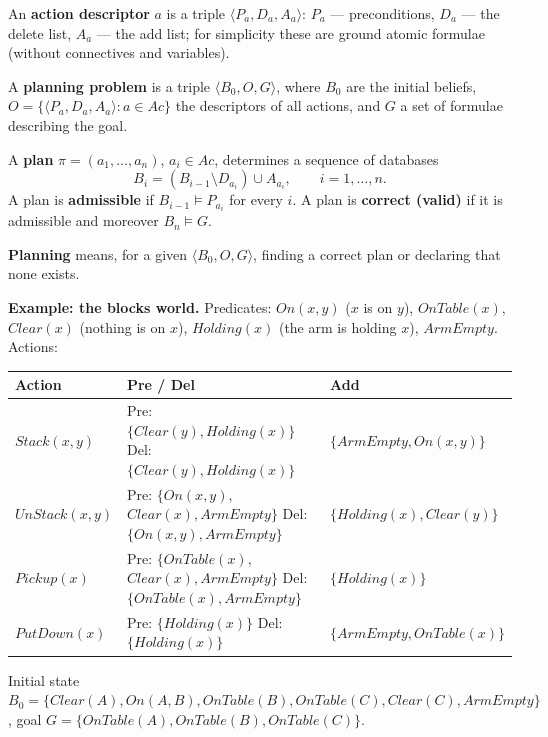 \documentclass[11pt,a4paper]{article}
\theoremstyle{definition}
\begin{document}
\begin{defbox}
An \textbf{action descriptor} $a$ is a triple $\langle P_a, D_a, A_a\rangle$:
$P_a$ --- preconditions, $D_a$ --- the delete list, $A_a$ --- the add list; for simplicity these
are ground atomic formulae (without connectives and variables).

A \textbf{planning problem} is a triple $\langle B_0, O, G\rangle$, where $B_0$ are the initial
beliefs, $O = \{\langle P_a,D_a,A_a\rangle : a \in \mathit{Ac}\}$ the descriptors of all actions,
and $G$ a set of formulae describing the goal.

A \textbf{plan} $\pi = (a_1,\dots,a_n)$, $a_i \in \mathit{Ac}$, determines a sequence of databases
\[
B_i = (B_{i-1} \setminus D_{a_i}) \cup A_{a_i}, \qquad i = 1,\dots,n .
\]
A plan is \textbf{admissible} if $B_{i-1} \models P_{a_i}$ for every $i$.
A plan is \textbf{correct (valid)} if it is admissible and moreover $B_n \models G$.

\textbf{Planning} means, for a given $\langle B_0,O,G\rangle$, finding a correct plan or declaring
that none exists.
\end{defbox}

\medskip
\noindent\textbf{Example: the blocks world.}
Predicates: $\mathit{On}(x,y)$ ($x$ is on $y$), $\mathit{OnTable}(x)$, $\mathit{Clear}(x)$
(nothing is on $x$), $\mathit{Holding}(x)$ (the arm is holding $x$), $\mathit{ArmEmpty}$.
Actions:
\begin{center}
\small
\begin{tabular}{p{} p{} p{}}
\toprule
\textbf{Action} & \textbf{Pre / Del} & \textbf{Add} \\
\midrule
$\mathit{Stack}(x,y)$
  & Pre: $\{\mathit{Clear}(y), \mathit{Holding}(x)\}$ \newline
    Del: $\{\mathit{Clear}(y), \mathit{Holding}(x)\}$
  & $\{\mathit{ArmEmpty}, \mathit{On}(x,y)\}$ \\
$\mathit{UnStack}(x,y)$
  & Pre: $\{\mathit{On}(x,y),$ $\mathit{Clear}(x),\mathit{ArmEmpty}\}$ \newline
    Del: $\{\mathit{On}(x,y),\mathit{ArmEmpty}\}$
  & $\{\mathit{Holding}(x), \mathit{Clear}(y)\}$ \\
$\mathit{Pickup}(x)$
  & Pre: $\{\mathit{OnTable}(x),$ $\mathit{Clear}(x),\mathit{ArmEmpty}\}$ \newline
    Del: $\{\mathit{OnTable}(x),\mathit{ArmEmpty}\}$
  & $\{\mathit{Holding}(x)\}$ \\
$\mathit{PutDown}(x)$
  & Pre: $\{\mathit{Holding}(x)\}$ \newline
    Del: $\{\mathit{Holding}(x)\}$
  & $\{\mathit{ArmEmpty}, \mathit{OnTable}(x)\}$ \\
\bottomrule
\end{tabular}
\end{center}
Initial state $B_0 = \{\mathit{Clear}(A), \mathit{On}(A,B), \mathit{OnTable}(B),
\mathit{OnTable}(C), \mathit{Clear}(C), \mathit{ArmEmpty}\}$,
goal $G = \{\mathit{OnTable}(A), \mathit{OnTable}(B), \mathit{OnTable}(C)\}$.
\end{document}
